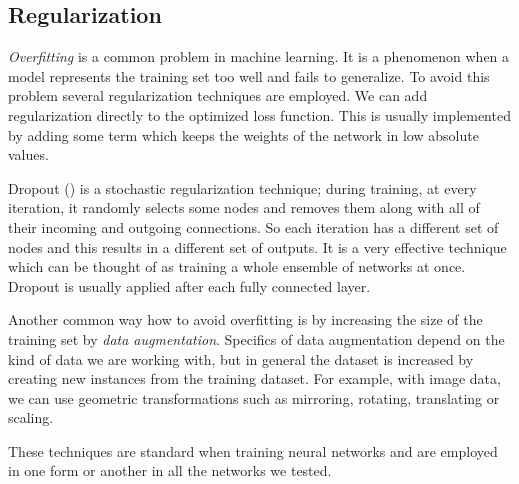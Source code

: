 \subsection{Regularization}
\label{sec:regularization}
\textit{Overfitting} is a common problem in machine learning. It is a phenomenon when a model represents the training set too well and fails to generalize. To avoid this problem several regularization techniques are employed. We can add regularization directly to the optimized loss function. This is usually implemented by adding some term which keeps the weights of the network in low absolute values. \par
Dropout (\cite{srivastava_dropout:_2014}) is a stochastic regularization technique; during training, at every iteration, it randomly selects some nodes and removes them along with all of their incoming and outgoing connections. So each iteration has a different set of nodes and this results in a different set of outputs. It is a very effective technique which can be thought of as training a whole ensemble of networks at once. Dropout is usually applied after each fully connected layer. \par
Another common way how to avoid overfitting is by increasing the size of the training set by \textit{data augmentation}. Specifics of data augmentation depend on the kind of data we are working with, but in general the dataset is increased by creating new instances from the training dataset. For example, with image data, we can use geometric transformations such as mirroring, rotating, translating or scaling. \par
These techniques are standard when training neural networks and are employed in one form or another in all the networks we tested.

